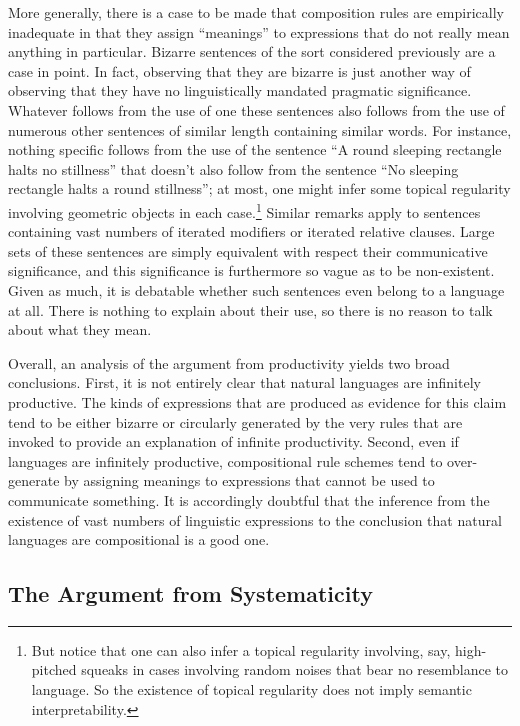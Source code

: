 More generally, there is a case to be made that composition rules are empirically inadequate in that they assign ``meanings'' to expressions that do not really mean anything in particular. Bizarre sentences of the sort considered previously are a case in point. In fact, observing that they are bizarre is just another way of observing that they have no linguistically mandated pragmatic significance. Whatever follows from the use of one these sentences also follows from the use of numerous other sentences of similar length containing similar words. For instance, nothing specific follows from the use of the sentence ``A round sleeping rectangle halts no stillness'' that doesn't also follow from the sentence ``No sleeping rectangle halts a round stillness''; at most, one might infer some topical regularity involving geometric objects in each case.\footnote{But notice that one can also infer a topical regularity involving, say, high-pitched squeaks in cases involving random noises that bear no resemblance to language. So the existence of topical regularity does not imply semantic interpretability.} Similar remarks apply to sentences containing vast numbers of iterated modifiers or iterated relative clauses. Large sets of these sentences are simply equivalent with respect their communicative significance, and this significance is furthermore so vague as to be non-existent. Given as much, it is debatable whether such sentences even belong to a language at all. There is nothing to explain about their use, so there is no reason to talk about what they mean. 

Overall, an analysis of the argument from productivity yields two broad conclusions. First, it is not entirely clear that natural languages are infinitely productive. The kinds of expressions that are produced as evidence for this claim tend to be either bizarre or circularly generated by the very rules that are invoked to provide an explanation of infinite productivity. Second, even if languages are infinitely productive, compositional rule schemes tend to over-generate by assigning meanings to expressions that cannot be used to communicate something. It is accordingly doubtful that the inference from the existence of vast numbers of linguistic expressions to the conclusion that natural languages are compositional is a good one. 

\subsection{The Argument from Systematicity}

